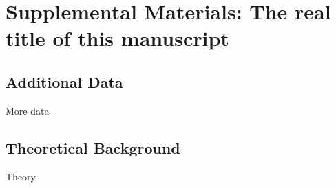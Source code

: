 \documentclass{biorxiv}
\newcommand{\beginsupplement}{%
        \setcounter{table}{0}
        \renewcommand{\thetable}{S\arabic{table}}%
        \setcounter{figure}{0}
        \renewcommand{\thefigure}{S\arabic{figure}}%
}
\begin{document}
\beginsupplement

\doublespacing


\section*{Supplemental Materials: The real title of this manuscript}

\vspace{0.5in}

\subsection*{Additional Data}

More data


\subsection*{Theoretical Background}

Theory 


%
%
%
%

\renewcommand\figureplace{}





%
%
%
%

\renewcommand\tableplace{} %




%
%
%
%

\newpage


\end{document}
